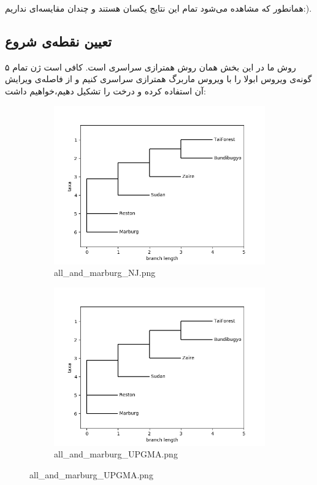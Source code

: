 \documentclass[11pt]{article}
\begin{document}
همانطور که مشاهده می‌شود تمام این نتایج یکسان هستند و چندان مقایسه‌ای نداریم:).
\subsection{تعیین نقطه‌ی شروع}
روش ما در این بخش همان روش همترازی سراسری است. کافی است ژن تمام ۵ گونه‌ی ویروس ابولا را با ویروس ماربرگ همترازی سراسری کنیم و از فاصله‌ی ویرایش آن استفاده کرده و درخت را تشکیل دهیم،‌خواهیم داشت:
\begin{figure}[H]
  \centering
  \begin{subfigure}[b]{0.4\linewidth}
    \includegraphics[width=\linewidth]{../Data/Trees/all_and_marburg_NJ.png}
    \caption{all\_and\_marburg\_NJ.png}
  \end{subfigure}
  \begin{subfigure}[b]{0.4\linewidth}
    \includegraphics[width=\linewidth]{../Data/Trees/all_and_marburg_NJ.png}
    \caption{all\_and\_marburg\_UPGMA.png}
  \end{subfigure}
\end{figure}
\end{document}
